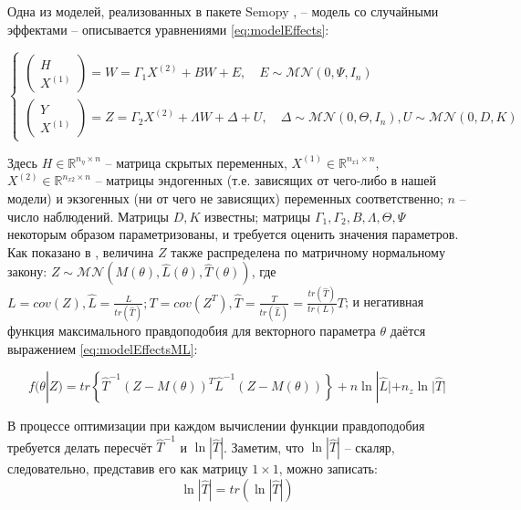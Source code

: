 Одна из моделей, реализованных в пакете Semopy \cite{semopy2}, -- модель со случайными эффектами -- описывается уравнениями \eqref{eq:modelEffects}:

\begin{equation}\label{eq:modelEffects}
    \begin{cases}
        \begin{pmatrix}
            H \\ X^{(1)}
        \end{pmatrix} = W = \Gamma_1 X^{(2)} + BW + E, \quad E \sim \mathcal{MN}(0, \Psi, I_n) \\
    \begin{pmatrix}
        Y \\ X^{(1)}
    \end{pmatrix} = Z = \Gamma_2 X^{(2)} + \Lambda W + \Delta + U, \quad \Delta \sim \mathcal{MN}(0, \Theta, I_n), U \sim \mathcal{MN}(0, D, K)

    \end{cases}
\end{equation}

Здесь $ H \in \mathds{R}^{n_\eta \times n} $ -- матрица скрытых переменных, $ X^{(1)} \in \mathds{R}^{n_{x1} \times n} $, $ X^{(2)} \in \mathds{R}^{n_{x2} \times n} $ -- матрицы эндогенных (т.е. зависящих от чего-либо в нашей модели) и экзогенных (ни от чего не зависящих) переменных соответственно; $n$ -- число наблюдений.
Матрицы $ D, K $ известны; матрицы $ \Gamma_1, \Gamma_2, B, \Lambda, \Theta, \Psi $ некоторым образом параметризованы, и требуется оценить значения параметров. \\

Как показано в \cite{semopy2}, величина $ Z $ также распределена по матричному нормальному закону: $ Z \sim \mathcal{MN}(M(\theta), \hat L(\theta), \hat T(\theta)) $, где $ L = cov(Z), \hat L = \frac{L}{tr(\hat T)}; T = cov(Z^T), \hat T = \frac{T}{tr(\hat L)} = \frac{tr(\hat T)}{tr(L)} T $; и негативная функция максимального правдоподобия для векторного параметра $ \theta $ даётся выражением \eqref{eq:modelEffectsML}:

\begin{equation}\label{eq:modelEffectsML}
    f(\theta | Z) = tr \left\{ \hat T^{-1}(Z-M(\theta))^T \hat L^{-1} (Z-M(\theta)) \right\} + n \ln |\hat L| + n_z \ln |\hat T|
\end{equation}

В процессе оптимизации при каждом вычислении функции правдоподобия требуется делать пересчёт $ \hat T ^{-1} $ и $ \ln |\hat T| $.
Заметим, что $ \ln |\hat T| $ -- скаляр, следовательно, представив его как матрицу $ 1 \times 1 $, можно записать:
\begin{equation} \label{eq:scalarTraceTrick}
    \ln |\hat T| = tr(\ln |\hat T|)
\end{equation}

